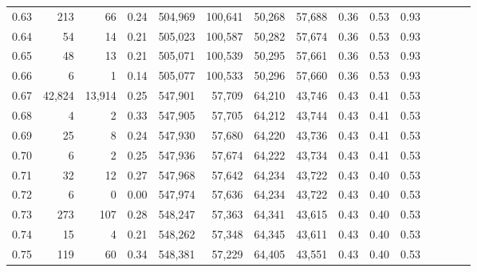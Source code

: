 \begin{tabular}{rrrcrrrrrrrrrrr}
0.63 &     213 &      66 &                                       0.24 &  504,969 &  100,641 &   50,268 &   57,688 &  0.36 &  0.53 &                         0.93 \\
0.64 &      54 &      14 &                                       0.21 &  505,023 &  100,587 &   50,282 &   57,674 &  0.36 &  0.53 &                         0.93 \\
0.65 &      48 &      13 &                                       0.21 &  505,071 &  100,539 &   50,295 &   57,661 &  0.36 &  0.53 &                         0.93 \\
0.66 &       6 &       1 &                                       0.14 &  505,077 &  100,533 &   50,296 &   57,660 &  0.36 &  0.53 &                         0.93 \\
0.67 &  42,824 &  13,914 &                                       0.25 &  547,901 &   57,709 &   64,210 &   43,746 &  0.43 &  0.41 &                         0.53 \\
0.68 &       4 &       2 &                                       0.33 &  547,905 &   57,705 &   64,212 &   43,744 &  0.43 &  0.41 &                         0.53 \\
0.69 &      25 &       8 &                                       0.24 &  547,930 &   57,680 &   64,220 &   43,736 &  0.43 &  0.41 &                         0.53 \\
0.70 &       6 &       2 &                                       0.25 &  547,936 &   57,674 &   64,222 &   43,734 &  0.43 &  0.41 &                         0.53 \\
0.71 &      32 &      12 &                                       0.27 &  547,968 &   57,642 &   64,234 &   43,722 &  0.43 &  0.40 &                         0.53 \\
0.72 &       6 &       0 &                                       0.00 &  547,974 &   57,636 &   64,234 &   43,722 &  0.43 &  0.40 &                         0.53 \\
0.73 &     273 &     107 &                                       0.28 &  548,247 &   57,363 &   64,341 &   43,615 &  0.43 &  0.40 &                         0.53 \\
0.74 &      15 &       4 &                                       0.21 &  548,262 &   57,348 &   64,345 &   43,611 &  0.43 &  0.40 &                         0.53 \\
0.75 &     119 &      60 &                                       0.34 &  548,381 &   57,229 &   64,405 &   43,551 &  0.43 &  0.40 &                         0.53 \\

\end{tabular}
